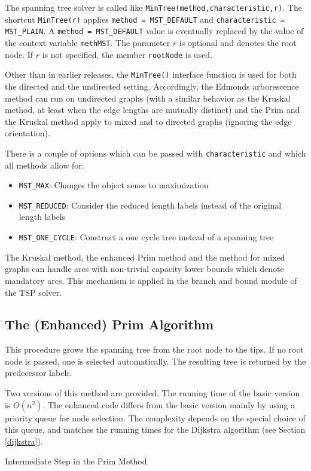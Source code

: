\documentclass[a4paper,11pt,twoside]{book}
\begin{document}
\begin{multicols}{2}
The spanning tree solver is called like \verb/MinTree(method,characteristic,r)/.
The shortcut \verb/MinTree(r)/ applies \verb/method = MST_DEFAULT/
and \verb/characteristic = MST_PLAIN/. A \verb/method = MST_DEFAULT/ value
is eventually replaced by the value of the context variable \verb/methMST/.
The parameter $r$ is optional and denotes the root node. If $r$ is not
specified, the member \verb/rootNode/ is used.

Other than in earlier releases, the \verb/MinTree()/ interface function is used
for both the directed and the undirected setting. Accordingly, the Edmonds
arborescence method can run on undirected graphs (with a similar behavior as
the Kruskal method, at least when the edge lengths are mutually distinct)
and the Prim and the Kruskal method apply to mixed and to directed graphs
(ignoring the edge orientation).

There is a couple of options which can be passed with \verb/characteristic/ and
which all methods allow for:
\begin{itemize}
\item \verb/MST_MAX/: Changes the object sense to maximization
\item \verb/MST_REDUCED/: Consider the reduced length labels instead of the
    original length labels
\item \verb/MST_ONE_CYCLE/: Construct a one cycle tree instead of a spanning tree
\end{itemize}
The Kruskal method, the enhanced Prim method and the method for mixed graphs
can handle arcs with non-trivial capacity lower bounds which denote mandatory
arcs. This mechanism is applied in the branch and bound module of the TSP solver.


\subsection{The (Enhanced) Prim Algorithm}
This procedure grows the spanning tree from the root node to the tips.
If no root node is passed, one is selected automatically. The resulting tree
is returned by the predecessor labels.

Two versions of this method are provided. The running time of the basic
version is $O(n^2)$. The enhanced code differs from the basic version mainly
by using a priority queue for node selection. The complexity depends on the
special choice of this queue, and matches the running times for the Dijkstra
algorithm (see Section \ref{dijkstra}).

\begin{figurehere}
\begin{center}
\epsfxsize=8cm
\vspace{0.5cm}
\caption{\label{flb_mintree}Intermediate Step in the Prim Method}
\end{center}
\end{figurehere}



\end{multicols}
\end{document}
